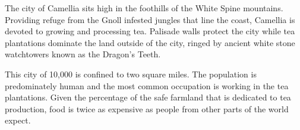 The city of Camellia sits high in the foothills of the White Spine mountains.
Providing refuge from the Gnoll infested jungles that line the coast, Camellia is devoted to growing and processing tea.
Palisade walls protect the city while tea plantations dominate the land outside of the city, ringed by ancient white stone watchtowers known as the Dragon's Teeth.

This city of 10,000 is confined to two square miles.
The population is predominately human and the most common occupation is working in the tea plantations.
Given the percentage of the safe farmland that is dedicated to tea production, food is twice as expensive as people from other parts of the world expect.
